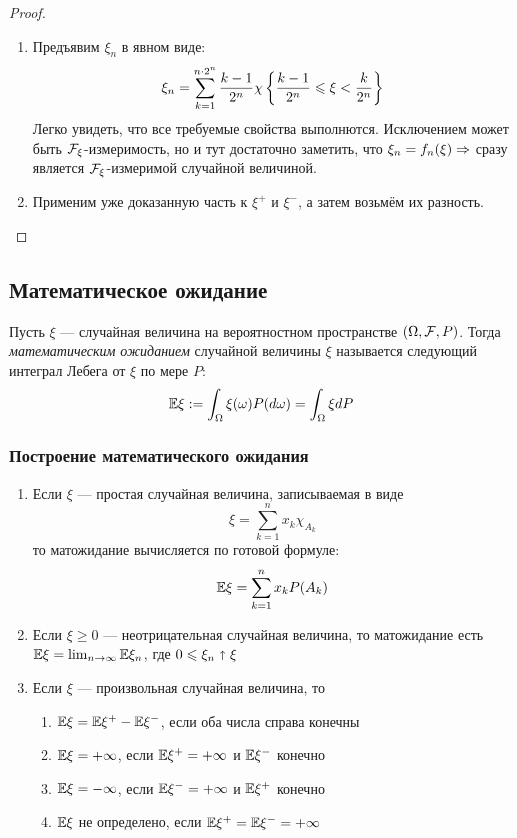 \begin{proof}~
	\begin{enumerate}
		\item Предъявим $\xi_n$ в явном виде:
		\[
			\xi_n = \sum_{k = 1}^{n \cdot 2^n} \frac{k - 1}{2^n} \chi\left\{\frac{k - 1}{2^n} \leqslant \xi < \frac{k}{2^n}\right\}
		\]
		Легко увидеть, что все требуемые свойства выполнются. Исключением может быть $\mathcal{F}_\xi$-измеримость, но и тут достаточно заметить, что $\xi_n = f_n(\xi) \Rightarrow$ сразу является $\mathcal{F}_\xi$-измеримой случайной величиной.
		
		\item Применим уже доказанную часть к $\xi^+$ и $\xi^-$, а затем возьмём их разность.
	\end{enumerate}
\end{proof}

\subsection{Математическое ожидание}

\begin{definition}
	Пусть $\xi$ --- случайная величина на вероятностном пространстве $(\Omega, \mathcal{F}, P)$. Тогда \textit{математическим ожиданием} случайной величины $\xi$ называется следующий интеграл Лебега от $\xi$ по мере $P$:
	\[
		\mathbb{E}\xi := \int_\Omega \xi(\omega)P(d\omega) = \int_\Omega \xi dP
	\]
\end{definition}

\subsubsection*{Построение математического ожидания}

\begin{enumerate}
	\item Если $\xi$ --- простая случайная величина, записываемая в виде
	\[
		\xi = \sum_{k = 1}^n x_k\chi_{A_k}
	\]
	то матожидание вычисляется по готовой формуле:
	\[
		\mathbb{E}\xi = \sum_{k = 1}^n x_kP(A_k)
	\]
	
	\item Если $\xi \ge 0$ --- неотрицательная случайная величина, то матожидание есть $\mathbb{E}\xi = \lim_{n \to \infty} \mathbb{E}\xi_n$, где $0 \leqslant \xi_n \shortuparrow \xi$
	
	\item Если $\xi$ --- произвольная случайная величина, то 
	\begin{enumerate}
		\item $\mathbb{E}\xi = \mathbb{E}\xi^+ - \mathbb{E}\xi^-$, если оба числа справа конечны
		
		\item $\mathbb{E}\xi = +\infty$, если $\mathbb{E}\xi^+ = +\infty$ и $\mathbb{E}\xi^-$ конечно
		
		\item $\mathbb{E}\xi = -\infty$, если $\mathbb{E}\xi^- = +\infty$ и $\mathbb{E}\xi^+$ конечно
		
		\item $\mathbb{E}\xi$ не определено, если $\mathbb{E}\xi^+ = \mathbb{E}\xi^- = +\infty$
	\end{enumerate}
\end{enumerate}

